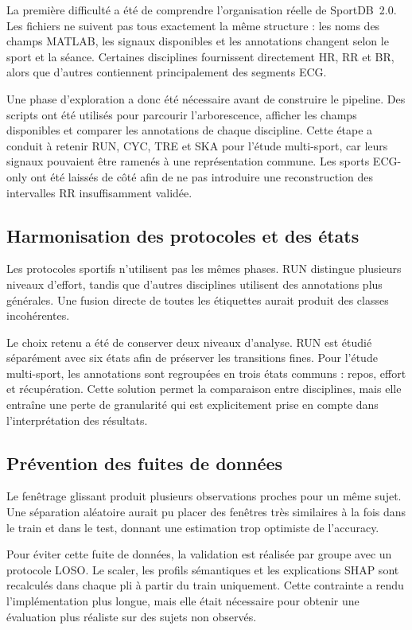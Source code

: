 \documentclass[12pt,a4paper]{article}
\begin{document}
La première difficulté a été de comprendre l'organisation réelle de
SportDB~2.0. Les fichiers ne suivent pas tous exactement la même structure :
les noms des champs MATLAB, les signaux disponibles et les annotations
changent selon le sport et la séance. Certaines disciplines fournissent
directement HR, RR et BR, alors que d'autres contiennent principalement des
segments ECG.

Une phase d'exploration a donc été nécessaire avant de construire le pipeline.
Des scripts ont été utilisés pour parcourir l'arborescence, afficher les
champs disponibles et comparer les annotations de chaque discipline. Cette
étape a conduit à retenir RUN, CYC, TRE et SKA pour l'étude multi-sport, car
leurs signaux pouvaient être ramenés à une représentation commune. Les sports
ECG-only ont été laissés de côté afin de ne pas introduire une reconstruction
des intervalles RR insuffisamment validée.

\subsection{Harmonisation des protocoles et des états}

Les protocoles sportifs n'utilisent pas les mêmes phases. RUN distingue
plusieurs niveaux d'effort, tandis que d'autres disciplines utilisent des
annotations plus générales. Une fusion directe de toutes les étiquettes aurait
produit des classes incohérentes.

Le choix retenu a été de conserver deux niveaux d'analyse. RUN est étudié
séparément avec six états afin de préserver les transitions fines. Pour
l'étude multi-sport, les annotations sont regroupées en trois états communs :
repos, effort et récupération. Cette solution permet la comparaison entre
disciplines, mais elle entraîne une perte de granularité qui est explicitement
prise en compte dans l'interprétation des résultats.

\subsection{Prévention des fuites de données}

Le fenêtrage glissant produit plusieurs observations proches pour un même
sujet. Une séparation aléatoire aurait pu placer des fenêtres très similaires
à la fois dans le train et dans le test, donnant une estimation trop
optimiste de l'accuracy.

Pour éviter cette fuite de données, la validation est réalisée par groupe avec
un protocole LOSO. Le scaler, les profils sémantiques et les explications SHAP
sont recalculés dans chaque pli à partir du train uniquement. Cette contrainte
a rendu l'implémentation plus longue, mais elle était nécessaire pour obtenir
une évaluation plus réaliste sur des sujets non observés.
\end{document}
